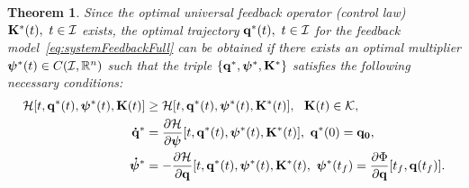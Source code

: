 \documentclass[
12pt,draftcls,onecolumn%
]{IEEEtran}
\newtheorem{theorem}{Theorem}
\begin{document}
\begin{theorem}
\label{thm:necessary-conditions}
Since the optimal universal feedback operator (control law) ${\bf K}^*(t),~t\in {\cal I}$ exists, the optimal trajectory ${\bf q}^*(t),~t\in {\cal I}$ for the feedback model~\eqref{eq:systemFeedbackFull} can be obtained if there exists an optimal multiplier $\boldsymbol{\psi}^*(t)\in C({\cal I},\mathbb{R}^n)$ such that the triple $\{{\bf q}^*,\boldsymbol{\psi}^*,{\bf K}^*\}$ satisfies the following necessary conditions:
\begin{subequations}
\begin{align}
\label{eq:inequality-H}
{\cal H}[t,{\bf q}^*(t),\boldsymbol{\psi}^*(t),{\bf K}(t)] & \geq{\cal H}[t,{\bf q^*}(t),\boldsymbol{\psi}^*(t),{\bf K^*}(t)], ~~{\bf K}(t)\in {\cal K},\\
\label{eq:state}
{\bf \dot q}^* &=\frac{\partial{\cal H}}{\partial\boldsymbol{\psi}} [t,{\bf q}^*(t),\boldsymbol{\psi}^*(t),{\bf K^*}(t)],~{\bf q}^*(0)={\bf q_0},\\
\label{eq:costate}
\boldsymbol{\dot\psi}^* &= -\frac{\partial{\cal H}}{\partial{\bf q}} [t,{\bf q}^*(t),\boldsymbol{\psi}^*(t),{\bf K}^*(t),~\boldsymbol{\psi}^*(t_f) = \frac{\partial\Phi}{\partial{\bf q}}[t_f,{\bf q}(t_f)].
\end{align}
\end{subequations}
\end{theorem}
\end{document}
